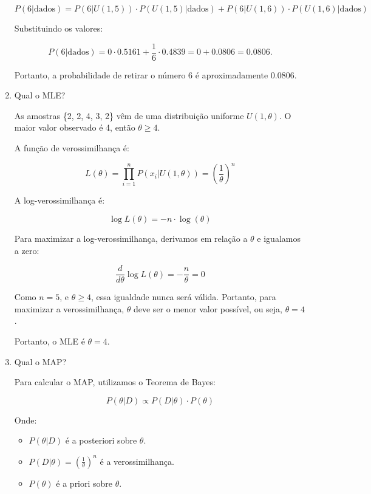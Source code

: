 \documentclass[12 pt]{article}
\begin{document}
\begin{enumerate}
\begin{tcolorbox}[colback=white, colframe=black, title=Resposta:]
    \[
    P(6 | \text{dados}) = P (6 | U(1,5)) \cdot P(U(1,5) | \text{dados}) + P(6 | U(1,6)) \cdot P(U(1,6) | \text{dados})
    \]

    Substituindo os valores:

    \[
    P(6 | \text{dados}) = 0 \cdot 0.5161 + \frac{1}{6} \cdot 0.4839 = 0 + 0.0806 = 0.0806.
    \]

    Portanto, a probabilidade de retirar o número 6 é aproximadamente 0.0806.

    \end{tcolorbox}
    \newpage
    \item Qual o MLE?
    \begin{tcolorbox}[colback=white, colframe=black, title=Resposta:]
        As amostras \{2, 2, 4, 3, 2\} vêm de uma distribuição uniforme \( U(1, \theta) \). O maior valor observado é 4, então \( \theta \geq 4 \).

    A função de verossimilhança é:

    \[
    L(\theta) = \prod_{i=1}^{n} P(x_i | U(1, \theta)) = \left( \frac{1}{\theta} \right)^n
    \]

    A log-verossimilhança é:

    \[
    \log L(\theta) = -n \cdot \log(\theta)
    \]

    Para maximizar a log-verossimilhança, derivamos em relação a \( \theta \) e igualamos a zero:
    
    \[
    \frac{d}{d\theta} \log L(\theta) = -\frac{n}{\theta} = 0
    \]
    
    Como \( n = 5 \), e \( \theta \geq 4 \), essa igualdade nunca será válida. Portanto, para maximizar a verossimilhança, \( \theta \) deve ser o menor valor possível, ou seja, \( \theta = 4 \).

    Portanto, o MLE é \( \theta = 4 \).


    \end{tcolorbox}
    \item Qual o MAP?
    \begin{tcolorbox}[colback=white, colframe=black, title=Resposta:]

        Para calcular o MAP, utilizamos o Teorema de Bayes:

        \[
        P(\theta | D) \propto P(D | \theta) \cdot P(\theta)
        \]
    
        Onde:
        \begin{itemize}
            \item \( P(\theta | D) \) é a posteriori sobre \( \theta \).
            \item \( P(D | \theta)  = \left( \frac{1}{\theta} \right)^n \) é a verossimilhança.
            \item \( P(\theta) \) é a priori sobre \( \theta \).
        \end{itemize}
    

\end{tcolorbox}
\end{enumerate}
\end{document}
